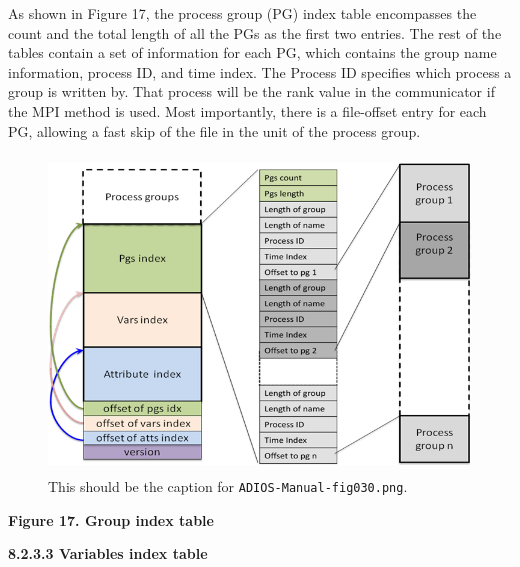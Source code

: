\vspace{10pt}
As shown in Figure 17, the process group (PG) index table encompasses the count 
and the total length of all the PGs as the first two entries. The rest of the tables 
contain a set of information for each PG, which contains the group name information, 
process ID, and time index. The Process ID specifies which process a group is written 
by. That process will be the rank value in the communicator if the MPI method is 
used. Most importantly, there is a file-offset entry for each PG, allowing a fast 
skip of the file in the unit of the process group.

\begin{figure}[htbp]
\begin{center}
\includegraphics[width=338pt, height=238pt]{ADIOS-Manual-fig030.png}
\caption{This should be the caption for \texttt{ADIOS-Manual-fig030.png}.}
\end{center}
\end{figure}\label{HRef119578810}\label{HToc144350176}

\vspace{22pt}
\begin{center}
{\color{color20} \textbf{Figure 17. Group index table}}
\end{center}

\vspace{10pt}
\textbf{8.2.3.3 Variables index table}

